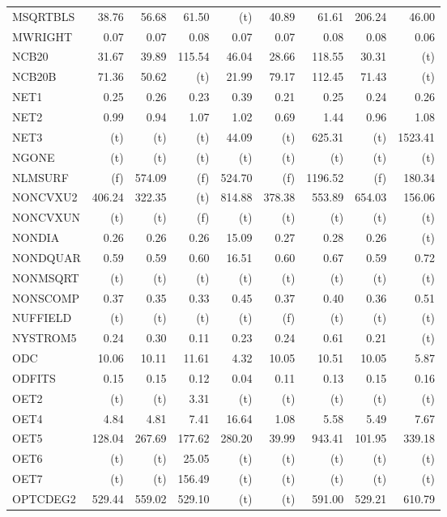 \documentclass[11pt,twoside]{article}
\begin{document}
{\begin{longtable}[c]{|l|r|r|r|r|r|r|r|r|}
MSQRTBLS & 38.76 & 56.68 & 61.50 & (t) & 40.89 & 61.61 & 206.24 & 46.00 \\
MWRIGHT & 0.07 & 0.07 & 0.08 & 0.07 & 0.07 & 0.08 & 0.08 & 0.06 \\
NCB20 & 31.67 & 39.89 & 115.54 & 46.04 & 28.66 & 118.55 & 30.31 & (t) \\
NCB20B & 71.36 & 50.62 & (t) & 21.99 & 79.17 & 112.45 & 71.43 & (t) \\
NET1 & 0.25 & 0.26 & 0.23 & 0.39 & 0.21 & 0.25 & 0.24 & 0.26 \\
NET2 & 0.99 & 0.94 & 1.07 & 1.02 & 0.69 & 1.44 & 0.96 & 1.08 \\
NET3 & (t) & (t) & (t) & 44.09 & (t) & 625.31 & (t) & 1523.41 \\
NGONE & (t) & (t) & (t) & (t) & (t) & (t) & (t) & (t) \\
NLMSURF & (f) & 574.09 & (f) & 524.70 & (f) & 1196.52 & (f) & 180.34 \\
NONCVXU2 & 406.24 & 322.35 & (t) & 814.88 & 378.38 & 553.89 & 654.03 & 156.06 \\
NONCVXUN & (t) & (t) & (f) & (t) & (t) & (t) & (t) & (t) \\
NONDIA & 0.26 & 0.26 & 0.26 & 15.09 & 0.27 & 0.28 & 0.26 & (t) \\
NONDQUAR & 0.59 & 0.59 & 0.60 & 16.51 & 0.60 & 0.67 & 0.59 & 0.72 \\
NONMSQRT & (t) & (t) & (t) & (t) & (t) & (t) & (t) & (t) \\
NONSCOMP & 0.37 & 0.35 & 0.33 & 0.45 & 0.37 & 0.40 & 0.36 & 0.51 \\
NUFFIELD & (t) & (t) & (t) & (t) & (f) & (t) & (t) & (t) \\
NYSTROM5 & 0.24 & 0.30 & 0.11 & 0.23 & 0.24 & 0.61 & 0.21 & (t) \\
ODC & 10.06 & 10.11 & 11.61 & 4.32 & 10.05 & 10.51 & 10.05 & 5.87 \\
ODFITS & 0.15 & 0.15 & 0.12 & 0.04 & 0.11 & 0.13 & 0.15 & 0.16 \\
OET2 & (t) & (t) & 3.31 & (t) & (t) & (t) & (t) & (t) \\
OET4 & 4.84 & 4.81 & 7.41 & 16.64 & 1.08 & 5.58 & 5.49 & 7.67 \\
OET5 & 128.04 & 267.69 & 177.62 & 280.20 & 39.99 & 943.41 & 101.95 & 339.18 \\
OET6 & (t) & (t) & 25.05 & (t) & (t) & (t) & (t) & (t) \\
OET7 & (t) & (t) & 156.49 & (t) & (t) & (t) & (t) & (t) \\
OPTCDEG2 & 529.44 & 559.02 & 529.10 & (t) & (t) & 591.00 & 529.21 & 610.79 \\

\end{longtable}}
\end{document}
